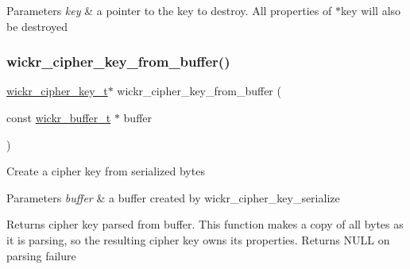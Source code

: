 \begin{DoxyParams}{Parameters}
{\em key} & a pointer to the key to destroy. All properties of \textquotesingle{}$\ast$key\textquotesingle{} will also be destroyed \\
\hline
\end{DoxyParams}
\mbox{\label{group__wickr__cipher_ga1c073b87f2141cf35a1d91ba10f9e5ba}} 
\subsubsection{\texorpdfstring{wickr\+\_\+cipher\+\_\+key\+\_\+from\+\_\+buffer()}{wickr\_cipher\_key\_from\_buffer()}}
{\footnotesize\ttfamily \hyperlink{structwickr__cipher__key}{wickr\+\_\+cipher\+\_\+key\+\_\+t}$\ast$ wickr\+\_\+cipher\+\_\+key\+\_\+from\+\_\+buffer (\begin{DoxyParamCaption}\item[{const \hyperlink{structwickr__buffer}{wickr\+\_\+buffer\+\_\+t} $\ast$}]{buffer }\end{DoxyParamCaption})}

Create a cipher key from serialized bytes


\begin{DoxyParams}{Parameters}
{\em buffer} & a buffer created by \textquotesingle{}wickr\+\_\+cipher\+\_\+key\+\_\+serialize\textquotesingle{} \\
\hline
\end{DoxyParams}
\begin{DoxyReturn}{Returns}
cipher key parsed from \textquotesingle{}buffer\textquotesingle{}. This function makes a copy of all bytes as it is parsing, so the resulting cipher key owns its properties. Returns N\+U\+LL on parsing failure 
\end{DoxyReturn}
\mbox{\label{group__wickr__cipher_ga8716aebf03497c379d5ff81fe32cde32}} 
